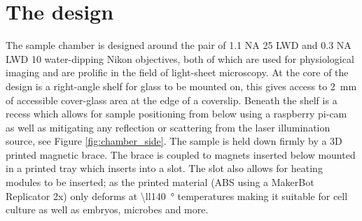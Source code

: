 \section{The design}
The sample chamber is designed around the pair of 1.1 NA \SI{25}{\times} LWD and 0.3 NA LWD \SI{10}{\times} water-dipping Nikon objectives, both of which are used for physiological imaging and are prolific in the field of light-sheet microscopy.
At the core of the design is a right-angle shelf for glass to be mounted on, this gives access to \SI{2}{\milli\metre} of accessible cover-glass area at the edge of a coverslip.
Beneath the shelf is a recess which allows for sample positioning from below using a raspberry pi-cam as well as mitigating any reflection or scattering from the laser illumination source, see Figure \ref{fig:chamber_side}.
The sample is held down firmly by a 3D printed magnetic brace.
The brace is coupled to magnets inserted below mounted in a printed tray which inserts into a slot.
The slot also allows for heating modules to be inserted; as the printed material (ABS using a MakerBot Replicator 2x) only deforms at \SI{\ll140}{\degree} temperatures making it suitable for cell culture as well as embryos, microbes and more.

